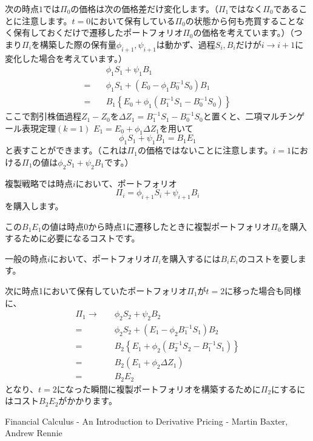 \documentclass[uplatex,a4j,12pt,dvipdfmx]{jsarticle}
\begin{document}
次の時点$1$では$\Pi_{0}$の価格は次の価格差だけ変化します。（$\Pi_{1}$ではなく$\Pi_{0}$であることに注意します。$t=0$において保有している$\Pi_{0}$の状態から何も売買することなく保有しておくだけで遷移したポートフォリオ$\Pi_{0}$の価格を考えています。）（つまり$\Pi_{i}$を構築した際の保有量$\phi_{i+1},\psi_{i+1}$は動かず、過程$S_{i},B_{i}$だけが$i \to i+1$に変化した場合を考えています。）
\[\begin{split} & \quad \phi_{1} S_{1} + \psi_{1} B_{1} \\ =& \quad \phi_{1} S_{1} + \left( E_{0} - \phi_{1} B_{0}^{-1} S_{0} \right) B_{1} \\ =& \quad B_{1} \left\{ E_{0} + \phi_{1} ( B_{1}^{-1} S_{1} - B_{0}^{-1} S_{0} ) \right\} \end{split}\]
ここで割引株価過程$Z_{1} - Z_{0}$を$\Delta Z_{1} = B_{1}^{-1} S_{1} - B_{0}^{-1} S_{0}$と置くと、二項マルチンゲール表現定理$(k=1)$ $E_{1} = E_{0} + \phi_{1} \Delta Z_{1}$を用いて\[\phi_{1} S_{1} + \psi_{1} B_{1} = B_{1} E_{1}\]と表すことができます。（これは$\Pi_{1}$の価格ではないことに注意します。$i=1$における$\Pi_{1}$の値は$\phi_{2} S_{1} + \psi_{2} B_{1}$です。）

複製戦略では時点$i$において、ポートフォリオ\[\Pi_{i} = \phi_{i+1} S_{i} + \psi_{i+1} B_{i}\]を購入します。

この$B_{1} E_{1}$の値は時点0から時点1に遷移したときに複製ポートフォリオ$\Pi_{0}$を購入するために必要になるコストです。

一般の時点$i$において、ポートフォリオ$\Pi_{i}$を購入するには$B_{i} E_{i}$のコストを要します。

次に時点1において保有していたポートフォリオ$\Pi_{1}$が$t=2$に移った場合も同様に、\[\begin{split} \Pi_{1} \to& \quad \phi_{2} S_{2} + \psi_{2} B_{2} \\ =& \quad \phi_{2} S_{2} + \left( E_{1} - \phi_{2} B_{1}^{-1} S_{1} \right) B_{2} \\ =& \quad B_{2} \left\{ E_{1} + \phi_{2} ( B_{2}^{-1} S_{2} - B_{1}^{-1} S_{1} ) \right\} \\ =& \quad B_{2} \left( E_{1} + \phi_{2} \Delta Z_{1} \right) \\ =& \quad B_{2} E_{2} \end{split}\]となり、$t=2$になった瞬間に複製ポートフォリオを構築するために$\Pi_{2}$にするにはコスト$B_{2} E_{2}$がかかります。


\begin{thebibliography}{9}
	Financial Calculus - An Introduction to Derivative Pricing - Martin Baxter, Andrew Rennie
\end{thebibliography}
\end{document}

